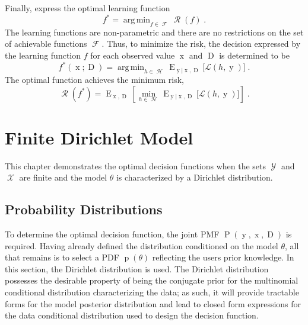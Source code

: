 \documentclass[12pt]{report}
\DeclareMathOperator*{\argmin}{arg\,min}
\DeclareMathOperator{\xrm}{\mathrm{x}}
\DeclareMathOperator{\yrm}{\mathrm{y}}
\DeclareMathOperator{\Drm}{\mathrm{D}}
\DeclareMathOperator{\Prm}{\mathrm{P}}
\DeclareMathOperator{\prm}{\mathrm{p}}
\DeclareMathOperator{\Erm}{\mathrm{E}}
\DeclareMathOperator{\Xcal}{\mathcal{X}}
\DeclareMathOperator{\Ycal}{\mathcal{Y}}
\DeclareMathOperator{\Hcal}{\mathcal{H}}
\DeclareMathOperator{\Fcal}{\mathcal{F}}
\DeclareMathOperator{\Rcal}{\mathcal{R}}
\begin{document}
Finally, express the optimal learning function
\begin{equation} 
f^* = \argmin_{f \in \Fcal} \Rcal(f) \;.
\end{equation}
The learning functions are non-parametric and there are no restrictions on the set of achievable functions $\Fcal$. Thus, to minimize the risk, the decision expressed by the learning function $f$ for each observed value $\xrm$ and $\Drm$ is determined to be
\begin{equation} \label{eq:f_opt_xD}
f^*(\xrm;\Drm) = \argmin_{h \in \Hcal} \Erm_{\yrm | \xrm,\Drm}\big[ \mathcal{L}(h,\yrm) \big] \;.
\end{equation}
The optimal function achieves the minimum risk,
\begin{equation} \label{eq_risk_min}
\Rcal(f^*) = \Erm_{\xrm,\Drm} \left[ \min_{h \in \Hcal} \Erm_{\yrm | \xrm,\Drm}\big[ \mathcal{L}(h,\yrm) \big] \right] \;.
\end{equation}













\chapter{Finite Dirichlet Model}



This chapter demonstrates the optimal decision functions when the sets $\Ycal$ and $\Xcal$ are finite and the model $\theta$ is characterized by a Dirichlet distribution.


\section{Probability Distributions}

To determine the optimal decision function, the joint PMF $\Prm(\yrm,\xrm,\Drm)$ is required. Having already defined the distribution conditioned on the model $\theta$, all that remains is to select a PDF $\prm(\theta)$ reflecting the users prior knowledge. In this section, the Dirichlet distribution is used. The Dirichlet distribution possesses the desirable property of being the conjugate prior for the multinomial conditional distribution characterizing the data; as such, it will provide tractable forms for the model posterior distribution and lead to closed form expressions for the data conditional distribution used to design the decision function.
\end{document}
